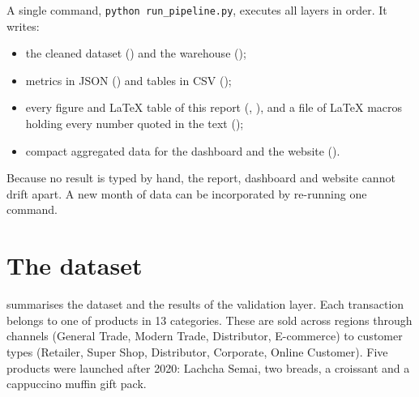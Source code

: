 A single command, \texttt{python run\_pipeline.py}, executes all layers in order. It writes:
\begin{itemize}
  \item the cleaned dataset () and the warehouse ();
  \item metrics in JSON () and tables in CSV ();
  \item every figure and \LaTeX{} table of this report (, ), and a
        file of \LaTeX{} macros holding every number quoted in the text ();
  \item compact aggregated data for the dashboard and the website ().
\end{itemize}
Because no result is typed by hand, the report, dashboard and website cannot drift apart. A new month of data
can be incorporated by re-running one command.

\section{The dataset}
 summarises the dataset and the results of the validation layer. Each transaction belongs to
one of \NProducts products in 13 categories. These are sold across \NRegions regions through \NChannels
channels (General Trade, Modern Trade, Distributor, E-commerce) to \NCustTypes customer types (Retailer, Super
Shop, Distributor, Corporate, Online Customer). Five products were launched after 2020: Lachcha Semai, two
breads, a croissant and a cappuccino muffin gift pack.

